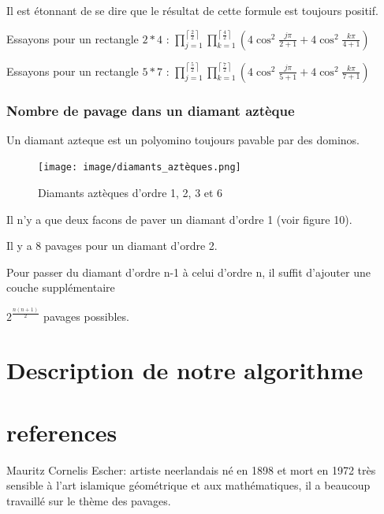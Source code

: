 \documentclass{article}
\begin{document}
Il est étonnant de se dire que le résultat de cette formule est toujours positif.

Essayons pour un rectangle $2*4$ : $\prod_{j=1}^{\left \lceil \frac{2}{2} \right \rceil} \prod_{k=1}^{\left \lceil \frac{4}{2} \right \rceil}\left ( 4\cos^{2}\frac{j\pi }{2+1}+4\cos^{2}\frac{k\pi }{4+1} \right )$

Essayons pour un rectangle $5*7$ : $\prod_{j=1}^{\left \lceil \frac{5}{2} \right \rceil} \prod_{k=1}^{\left \lceil \frac{7}{2} \right \rceil}\left ( 4\cos^{2}\frac{j\pi }{5+1}+4\cos^{2}\frac{k\pi }{7+1} \right )$



\hspace{2cm}

\subsubsection{Nombre de pavage dans un diamant aztèque}

Un diamant azteque est un polyomino toujours pavable par des dominos.

\begin{figure} [h]
    \center
    \texttt{[image: image/diamants\_aztèques.png]}
    \caption{Diamants aztèques d'ordre 1, 2, 3 et 6}
\end{figure}

Il n'y a que deux facons de paver un diamant d'ordre 1 (voir figure 10).

Il y a 8 pavages pour un diamant d'ordre 2.

Pour passer du diamant d'ordre n-1 à celui d'ordre n, il suffit d'ajouter une couche supplémentaire

$2^{\frac{n\left ( n+1 \right )}{2}}$ pavages possibles.

\clearpage

\section{Description de notre algorithme}

\clearpage

\section{references}


Mauritz Cornelis Escher: artiste neerlandais né en 1898 et mort en 1972 très sensible à l’art islamique géométrique et aux mathématiques, il a beaucoup travaillé sur le thème des pavages.
\end{document}
